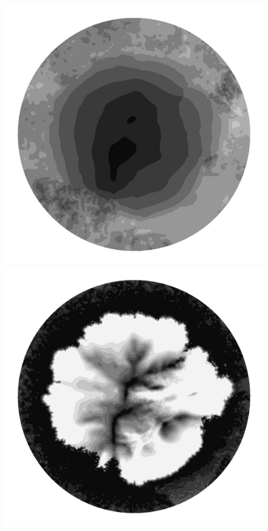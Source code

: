 \begin{figure}
  \begin{minipage}[b]{0.30\linewidth}
    \includegraphics[width=1.0\textwidth]{images/EISMINT_II/U/S_35000.jpg}
  \end{minipage}
  \quad
  \begin{minipage}[b]{0.30\linewidth}
    \includegraphics[width=1.0\textwidth]{images/EISMINT_II/U/beta_35000.jpg}

\end{minipage}
\end{figure}
